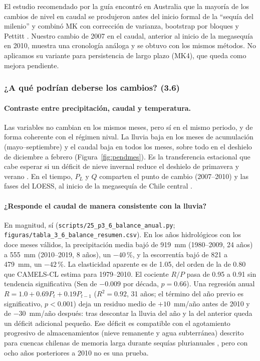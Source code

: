 \documentclass[11pt,a4paper]{article}
\newcommand{\archivo}[1]{\nolinkurl{#1}}
\newcommand{\PL}{P_L}
\newcommand{\Qm}{Q}
\begin{document}
El estudio recomendado por la guía encontró en Australia que la mayoría de los cambios de nivel en caudal se produjeron antes del inicio formal de la ``sequía del milenio'' y combinó MK con corrección de varianza, bootstrap por bloques y Pettitt \citep{Amirthanathan2023}. Nuestro cambio de 2007 en el caudal, anterior al inicio de la megasequía en 2010, muestra una cronología análoga y se obtuvo con los mismos métodos. No aplicamos su variante para persistencia de largo plazo (MK4), que queda como mejora pendiente.

\subsubsection{¿A qué podrían deberse los cambios? (3.6)}
\label{sec:p36}

\paragraph{Contraste entre precipitación, caudal y temperatura.} Las variables no cambian en los mismos meses, pero sí en el mismo periodo, y de forma coherente con el régimen nival. La lluvia baja en los meses de acumulación (mayo--septiembre) y el caudal baja en todos los meses, sobre todo en el deshielo de diciembre a febrero (Figura~\ref{fig:pendmes}). Es la transferencia estacional que cabe esperar si un déficit de nieve invernal reduce el deshielo de primavera y verano \citep{Masiokas2006}. En el tiempo, $\PL$ y $\Qm$ comparten el punto de cambio (2007--2010) y las fases del LOESS, al inicio de la megasequía de Chile central \citep{Garreaud2017,Garreaud2020}.

\paragraph{¿Responde el caudal de manera consistente con la lluvia?} En magnitud, sí (\archivo{scripts/25_p3_6_balance_anual.py}; \archivo{figuras/tabla_3_6_balance_resumen.csv}). En los años hidrológicos con los doce meses válidos, la precipitación media bajó de 919~mm (1980--2009, 24 años) a 555~mm (2010--2019, 8 años), un $-40$\,\%, y la escorrentía bajó de 821 a 479~mm, un $-42$\,\%. La elasticidad aparente es de 1.05, del orden de la de 0.80 que CAMELS-CL estima para 1979--2010. El cociente $R/P$ pasa de 0.95 a 0.91 sin tendencia significativa (Sen de $-0.009$ por década, $p=0.66$). Una regresión anual $R=1.0+0.69P_t+0.19P_{t-1}$ ($R^2=0.92$, 31 años; el término del año previo es significativo, $p<0.001$) deja un residuo medio de $+10$~mm/año antes de 2010 y de $-30$~mm/año después: tras descontar la lluvia del año y la del anterior queda un déficit adicional pequeño. Ese déficit es compatible con el agotamiento progresivo de almacenamientos (nieve remanente y agua subterránea) descrito para cuencas chilenas de memoria larga durante sequías plurianuales \citep{AlvarezGarreton2021}, pero con ocho años posteriores a 2010 no es una prueba.
\end{document}
